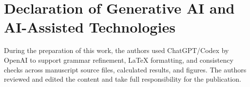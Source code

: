     \section*{Declaration of Generative AI and AI-Assisted Technologies}
        During the preparation of this work, the authors used ChatGPT/Codex by OpenAI to support grammar refinement, LaTeX formatting, and consistency checks across manuscript source files, calculated results, and figures. The authors reviewed and edited the content and take full responsibility for the publication.
